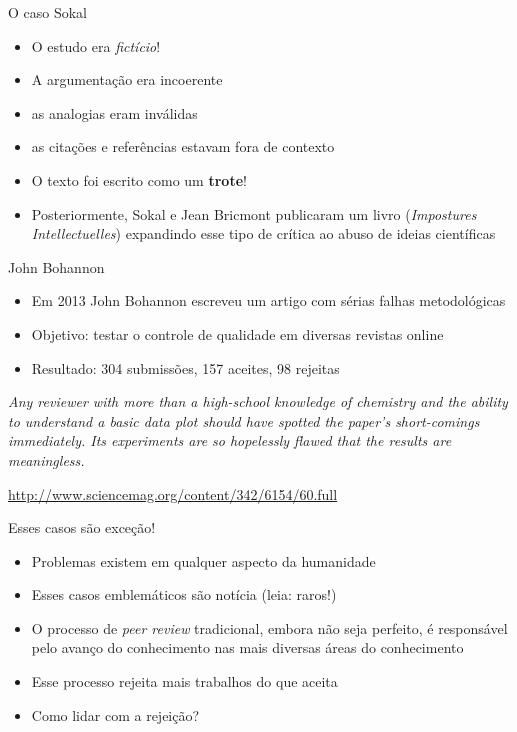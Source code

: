 \documentclass{beamer}
\begin{document}
\begin{frame}{O caso Sokal}
  \begin{itemize}
    \footnotesize
  \item O estudo era {\em fictício}!
    \medskip
  \item A argumentação era incoerente
    \medskip
  \item as analogias eram inválidas
    \medskip
  \item as citações e referências estavam fora de contexto
    \medskip
  \item O texto foi escrito como um {\bf trote}!
    \medskip
  \item Posteriormente, Sokal e Jean Bricmont publicaram um livro
    ({\em Impostures Intellectuelles}) expandindo esse tipo de crítica
    ao abuso de ideias científicas
  \end{itemize}
\end{frame}

\begin{frame}{John Bohannon}
  \begin{itemize}
    \footnotesize
  \item Em 2013 John Bohannon escreveu um artigo com sérias falhas
    metodológicas
    \medskip
  \item Objetivo: testar o controle de qualidade em diversas revistas
    online
    \medskip
  \item Resultado: 304 submissões, 157 aceites, 98 rejeitas
  \end{itemize}
    \bigskip
  \begin{block}{}
    \footnotesize
    \em
    Any reviewer with more than a high-school knowledge of chemistry
    and the ability to understand a basic data plot should have
    spotted the paper's short-comings immediately. Its experiments are
    so hopelessly flawed that the results are meaningless.
  \end{block}

  \vfill
  \tiny
  \hfill \url{http://www.sciencemag.org/content/342/6154/60.full}
\end{frame}

\begin{frame}{Esses casos são exceção!}
  \begin{itemize}
    \footnotesize
  \item Problemas existem em qualquer aspecto da humanidade
    \medskip
  \item Esses casos emblemáticos são notícia (leia: raros!)
    \medskip
  \item O processo de {\em peer review} tradicional, embora não seja
    perfeito, é responsável pelo avanço do conhecimento nas mais
    diversas áreas do conhecimento
    \medskip
  \item Esse processo rejeita mais trabalhos do que aceita
    \medskip
  \item Como lidar com a rejeição?
  \end{itemize}
\end{frame}
\end{document}
